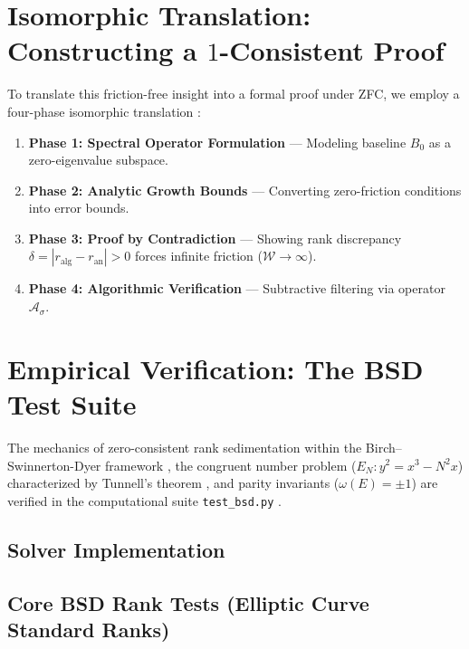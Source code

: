 \documentclass[11pt,a4paper]{article}
\begin{document}
\section{Isomorphic Translation: Constructing a \texorpdfstring{$1$}{1}-Consistent Proof}
To translate this friction-free insight into a formal proof under ZFC, we employ a four-phase isomorphic translation \cite{nicht_metaphysics_paper_0}:
\begin{enumerate}
    \item \textbf{Phase 1: Spectral Operator Formulation} — Modeling baseline $B_0$ as a zero-eigenvalue subspace.
    \item \textbf{Phase 2: Analytic Growth Bounds} — Converting zero-friction conditions into error bounds.
    \item \textbf{Phase 3: Proof by Contradiction} — Showing rank discrepancy $\delta = |r_{\text{alg}} - r_{\text{an}}| > 0$ forces infinite friction ($\mathcal{W} \to \infty$).
    \item \textbf{Phase 4: Algorithmic Verification} — Subtractive filtering via operator $\mathcal{A}_\sigma$.
\end{enumerate}

\section{Empirical Verification: The BSD Test Suite}
The mechanics of zero-consistent rank sedimentation within the Birch--Swinnerton-Dyer framework \cite{birch_swinnerton_dyer_1965}, the congruent number problem ($E_N: y^2 = x^3 - N^2 x$) characterized by Tunnell's theorem \cite{tunnell_1983}, and parity invariants ($\omega(E) = \pm 1$) are verified in the computational suite \texttt{test\_bsd.py} \cite{nicht_physics_repo, tunnell_1983}.
\subsection{Solver Implementation}
\begin{figure}[H]
\centering
\begin{minipage}{0.95\textwidth}

\end{minipage}
\end{figure}

\subsection{Core BSD Rank Tests (Elliptic Curve Standard Ranks)}
\begin{figure}[H]
\centering
\begin{minipage}{0.95\textwidth}

\end{minipage}
\end{figure}
\end{document}
